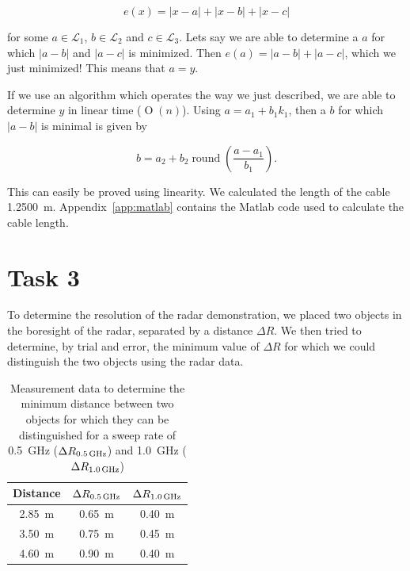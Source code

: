 \documentclass[11pt,titlepage]{report}
\begin{document}
\begin{equation}
	e(x) = |x-a|+|x-b|+|x-c|
\end{equation}

for some $a \in \mathcal{L}_1$, $b \in \mathcal{L}_2$ and $c \in \mathcal{L}_3$. Lets say we are able to determine a $a$ for which $|a-b|$ and $|a-c|$ is minimized. Then $e(a)=|a-b|+|a-c|$, which we just minimized! This means that $a=y$.

If we use an algorithm which operates the way we just described, we are able to determine $y$ in linear time ($\operatorname{O}(n)$). Using $a = a_1 + b_1 k_1$, then a $b$ for which $|a-b|$ is minimal is given by

\begin{equation}
	b=a_2+b_2 \operatorname{round}\left(\frac{a-a_1}{b_1}\right).
\end{equation}

This can easily be proved using linearity. We calculated the length of the cable \SI{1.2500}{m}. Appendix~\ref{app:matlab} contains the Matlab code used to calculate the cable length.

\section{Task 3}
To determine the resolution of the radar demonstration, we placed two objects in the boresight of the radar, separated by a distance $\Delta R$. We then tried to determine, by trial and error, the minimum value of $\Delta R$ for which we could distinguish the two objects using the radar data.

\begin{table}[H]
	\centering
	\caption{Measurement data to determine the minimum distance between two objects for which they can be distinguished for a sweep rate of \SI{0.5}{GHz} ($\Delta R_{\text{\SI{0.5}{GHz}}}$) and \SI{1.0}{GHz} ($\Delta R_{\text{\SI{1.0}{GHz}}}$)}
	\label{tab:ass-2-dist-obj}
	\begin{tabular}{c c c}
		\hline\hline
		Distance & $\Delta R_{\text{\SI{0.5}{GHz}}}$ & $\Delta R_{\text{\SI{1.0}{GHz}}}$ \\
		\hline
		\SI{2.85}{m} & \SI{0.65}{m} & \SI{0.40}{m} \\
		\SI{3.50}{m} & \SI{0.75}{m} & \SI{0.45}{m} \\
		\SI{4.60}{m} & \SI{0.90}{m} & \SI{0.40}{m} \\
		\hline
	\end{tabular}
\end{table}
\end{document}
